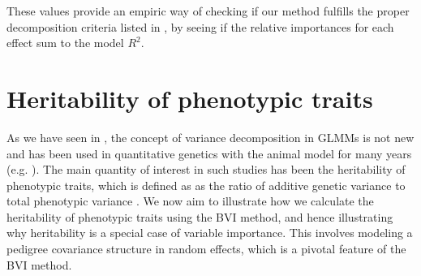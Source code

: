 \noindent These values provide an empiric way of checking if our method fulfills the proper decomposition criteria listed in , by seeing if the relative importances for each effect sum to the model $R^2$.


\section{Heritability of phenotypic traits}
As we have seen in , the concept of variance decomposition in GLMMs is not new and has been used in quantitative genetics with the animal model for many years (e.g. \citet{Kruuk2004}). The main quantity of interest in such studies has been the heritability of phenotypic traits, which is defined as as the ratio of additive genetic variance to total phenotypic variance \citep{Wilson_heritability}. We now aim to illustrate how we calculate the heritability of phenotypic traits using the BVI method, and hence illustrating why heritability is a special case of variable importance. This involves modeling a pedigree covariance structure in random effects, which is a pivotal feature of the BVI method.
